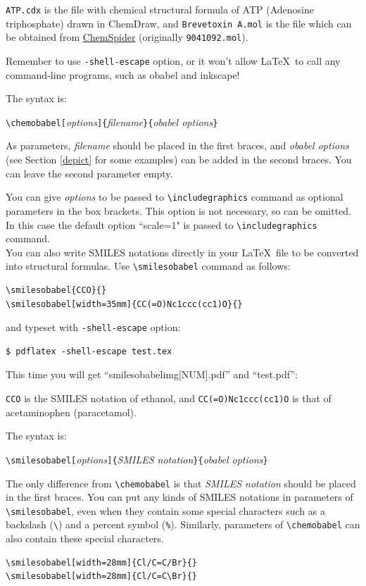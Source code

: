 \documentclass[12pt]{ltjsarticle}
\begin{document}
\verb|ATP.cdx| is the file with chemical structural formula of
ATP (Adenosine triphosphate) drawn in ChemDraw, and
\verb|Brevetoxin A.mol| is the file which can be obtained from
\href{http://www.chemspider.com/}{ChemSpider} (originally \verb|9041092.mol|).

Remember to use \verb|-shell-escape| option, or it won't allow
\LaTeX\ to call any command-line programs, such as obabel and inkscape!

The syntax is:
\begin{center}
\verb|\chemobabel[|\textit{options}\verb|]{|\textit{filename}\verb|}{|\textit{obabel options}\verb|}|
\end{center}
As parameters, \textit{filename} should be placed in the first braces, and
\textit{obabel options} (see Section \ref{depict} for some examples)
can be added in the second braces.
You can leave the second parameter empty.

You can give \textit{options} to be passed to \verb|\includegraphics|
command as optional parameters in the box brackets.
This option is not necessary, so can be omitted. In this case the default
option ``scale=1" is passed to \verb|\includegraphics| command. \\

You can also write SMILES notations directly in your \LaTeX\ file to be
converted into structural formulas.
Use \verb|\smilesobabel| command as follows:
\begin{verbatim}
\smilesobabel{CCO}{}
\smilesobabel[width=35mm]{CC(=O)Nc1ccc(cc1)O}{}
\end{verbatim}
and typeset with \verb|-shell-escape| option:
\begin{verbatim}
$ pdflatex -shell-escape test.tex
\end{verbatim}
This time you will get ``smilesobabelimg[NUM].pdf'' and ``test.pdf'':
\begin{figure}[h]
  \centering
   \quad
\end{figure}
\verb|CCO| is the SMILES notation of ethanol, and
\verb|CC(=O)Nc1ccc(cc1)O| is that of acetaminophen (paracetamol).

The syntax is:
\begin{center}
\verb|\smilesobabel[|\textit{options}\verb|]{|\textit{SMILES notation}\verb|}{|\textit{obabel options}\verb|}|
\end{center}
The only difference from \verb|\chemobabel| is that
\textit{SMILES notation} should be placed in the first braces.
You can put any kinds of SMILES notations in parameters of
\verb|\smilesobabel|, even when they contain some special characters
such as a backslash (\verb|\|) and a percent symbol (\verb|%|).
Similarly, parameters of \verb|\chemobabel| can also contain
these special characters.
\begin{verbatim}
\smilesobabel[width=28mm]{Cl/C=C/Br}{}
\smilesobabel[width=28mm]{Cl/C=C\Br}{}
\end{verbatim}
\begin{figure}[h]
  \centering
   \quad
\end{figure}
\end{document}
